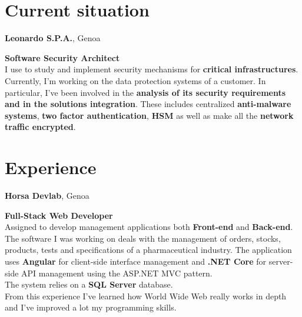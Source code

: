 \documentclass[a4paper,10pt]{article}
\begin{document}
\begin{adjustbox}{valign=t}
\begin{minipage}{0.6\textwidth} %
\section*{Current situation}
\begin{description}
\raggedright
\item[\normalfont \textcolor{ColorOne}{Sep. 2021}] \textbf{Leonardo S.P.A.}, Genoa\\ \medskip

\textbf{Software Security Architect}\\

I use to study and implement security mechanisms for \textbf{critical infrastructures}.\\
Currently, I'm working on the data protection systems of a customer. In particular, I've been involved in the \textbf{analysis of its security requirements and in the solutions integration}. These includes centralized \textbf{anti-malware systems}, \textbf{two factor authentication}, \textbf{HSM} as well as make all the \textbf{network traffic encrypted}.\\

\end{description}

\section*{Experience}
\begin{description}
\raggedright
\item[\normalfont \textcolor{ColorOne}{Sep. 2018 -- Sep. 2021.}] 
	\textbf{Horsa Devlab}, Genoa\\ \medskip
	
	\textbf{Full-Stack Web Developer}\\
	
	Assigned to develop management applications both \textbf{Front-end} and \textbf{Back-end}.\\
    The software I was working on deals with the management of orders, stocks, products, tests and specifications of a pharmaceutical industry. The application uses \textbf{Angular} for client-side interface management and \textbf{.NET Core} for server-side API management using the ASP.NET MVC pattern.\\
    The system relies on a \textbf{SQL Server} database.\\
    From this experience I've learned how World Wide Web really works in depth and I've improved a lot my programming skills. 
\end{description}


\end{minipage}
\end{adjustbox}
\end{document}
